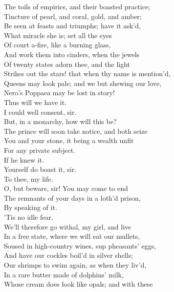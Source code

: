 \documentclass[a4paper,oneside]{memoir}
\begin{document}
\begin{drama*}
The toils of empirics, and their boasted practice;\\
Tincture of pearl, and coral, gold, and amber;\\
Be seen at feasts and triumphs; have it ask'd,\\
What miracle she is; set all the eyes\\
Of court a-fire, like a burning glass,\\
And work them into cinders, when the jewels\\
Of twenty states adorn thee, and the light\\
Strikes out the stars! that when thy name is mention'd,\\
Queens may look pale; and we but shewing our love,\\
Nero's Poppaea may be lost in story!\\
Thus will we have it.\\
\dolspeaks {} I could well consent, sir.\\
But, in a monarchy, how will this be?\\
The prince will soon take notice, and both seize\\
You and your stone, it being a wealth unfit\\
For any private subject.\\
\mammonspeaks {} If he knew it.\\
\dolspeaks Yourself do boast it, sir.\\
\mammonspeaks {} To thee, my life.\\
\dolspeaks O, but beware, sir! You may come to end\\
The remnants of your days in a loth'd prison,\\
By speaking of it.\\
\mammonspeaks {} 'Tis no idle fear.\\
We'll therefore go withal, my girl, and live\\
In a free state, where we will eat our mullets,\\
Soused in high-country wines, sup pheasants' eggs,\\
And have our cockles boil'd in silver shells;\\
Our shrimps to swim again, as when they liv'd,\\
In a rare butter made of dolphins' milk,\\
Whose cream does look like opals; and with these\\

\end{drama*}
\end{document}
